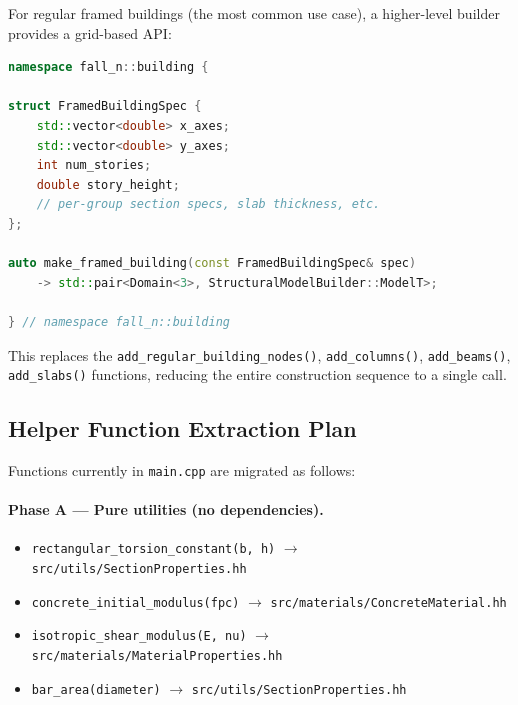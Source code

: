 For regular framed buildings (the most common use case), a higher-level
builder provides a grid-based API:

\begin{lstlisting}[language=C++,basicstyle=\ttfamily\small]
namespace fall_n::building {

struct FramedBuildingSpec {
    std::vector<double> x_axes;
    std::vector<double> y_axes;
    int num_stories;
    double story_height;
    // per-group section specs, slab thickness, etc.
};

auto make_framed_building(const FramedBuildingSpec& spec)
    -> std::pair<Domain<3>, StructuralModelBuilder::ModelT>;

} // namespace fall_n::building
\end{lstlisting}

This replaces the \texttt{add\_regular\_building\_nodes()},
\texttt{add\_columns()}, \texttt{add\_beams()}, \texttt{add\_slabs()}
functions, reducing the entire construction sequence to a single call.


\subsection{Helper Function Extraction Plan}

Functions currently in \texttt{main.cpp} are migrated as follows:

\paragraph{Phase A --- Pure utilities (no dependencies).}
\begin{itemize}
  \item \texttt{rectangular\_torsion\_constant(b, h)}
        $\to$ \texttt{src/utils/SectionProperties.hh}
  \item \texttt{concrete\_initial\_modulus(fpc)}
        $\to$ \texttt{src/materials/ConcreteMaterial.hh}
  \item \texttt{isotropic\_shear\_modulus(E, nu)}
        $\to$ \texttt{src/materials/MaterialProperties.hh}
  \item \texttt{bar\_area(diameter)}
        $\to$ \texttt{src/utils/SectionProperties.hh}
\end{itemize}

